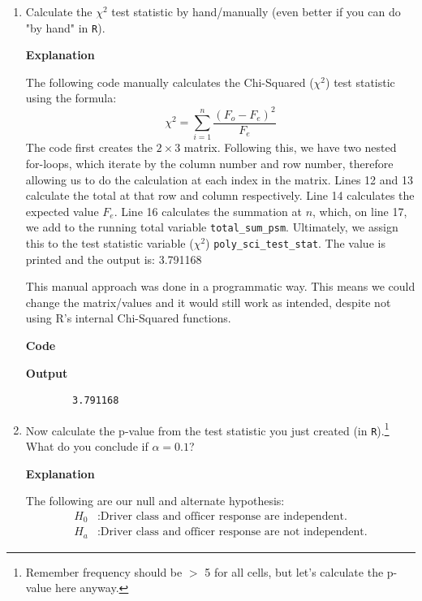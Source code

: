 \documentclass[12pt,letterpaper]{article}
\begin{document}
\begin{enumerate}
	
	\item [(a)]
	Calculate the $\chi^2$ test statistic by hand/manually (even better if you can do "by hand" in \texttt{R}).\\
	\vspace{2cm}

	\textbf{Explanation}
	\vspace{.5cm}

	The following code manually calculates the Chi-Squared ($\chi^2$) test statistic using the formula:
	\[
	\chi^2 = \sum_{i=1}^{n} \frac{(F_o - F_e)^2}{F_e}
	\]
	The code first creates the $2 \times 3$ matrix. Following this, we have two nested for-loops, which iterate by the column number and row number, therefore allowing us to do the calculation at each index in the matrix. Lines 12 and 13 calculate the total at that row and column respectively. Line 14 calculates the expected value $F_e$. Line 16 calculates the summation at $n$, which, on line 17, we add to the running total variable \texttt{total\_sum\_psm}. Ultimately, we assign this to the test statistic variable ($\chi^2$) \texttt{poly\_sci\_test\_stat}. The value is printed and the output is: 3.791168

	This manual approach was done in a programmatic way. This means we could change the matrix/values and it would still work as intended, despite not using R's internal Chi-Squared functions.
	\vspace{1cm}

	\textbf{Code}
    
	\vspace{1cm}
    \textbf{Output}
	\begin{verbatim}
        3.791168
	\end{verbatim}

	
	\item [(b)]
	Now calculate the p-value from the test statistic you just created (in \texttt{R}).\footnote{Remember frequency should be $>$ 5 for all cells, but let's calculate the p-value here anyway.}  What do you conclude if $\alpha = 0.1$?\\
	
	\vspace{2cm}

	\textbf{Explanation}
	\vspace{.5cm}

	The following are our null and alternate hypothesis:
	\begin{align*}
	H_0 &: \text{Driver class and officer response are independent.} \\
	H_a &: \text{Driver class and officer response are not independent.}
	\end{align*}


\end{enumerate}
\end{document}
